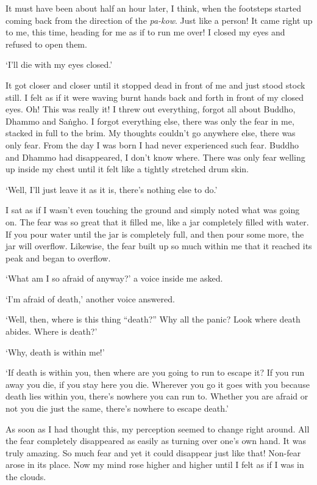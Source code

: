 It must have been about half an hour later, I think, when the footsteps started coming back from the direction of the \textit{pa-kow}. Just like a person! It came right up to me, this time, heading for me as if to run me over! I closed my eyes and refused to open them.

`I'll die with my eyes closed.'

It got closer and closer until it stopped dead in front of me and just stood stock still. I felt as if it were waving burnt hands back and forth in front of my closed eyes. Oh! This was really it! I threw out everything, forgot all about Buddho, Dhammo and Sa\.ngho. I forgot everything else, there was only the fear in me, stacked in full to the brim. My thoughts couldn't go anywhere else, there was only fear. From the day I was born I had never experienced such fear. Buddho and Dhammo had disappeared, I don't know where. There was only fear welling up inside my chest until it felt like a tightly stretched drum skin.

`Well, I'll just leave it as it is, there's nothing else to do.'

I sat as if I wasn't even touching the ground and simply noted what was going on. The fear was so great that it filled me, like a jar completely filled with water. If you pour water until the jar is completely full, and then pour some more, the jar will overflow. Likewise, the fear built up so much within me that it reached its peak and began to overflow.

`What am I so afraid of anyway?' a voice inside me asked.

`I'm afraid of death,' another voice answered.

`Well, then, where is this thing ``death?'' Why all the panic? Look where death abides. Where is death?'

`Why, death is within me!'

`If death is within you, then where are you going to run to escape it? If you run away you die, if you stay here you die. Wherever you go it goes with you because death lies within you, there's nowhere you can run to. Whether you are afraid or not you die just the same, there's nowhere to escape death.'

As soon as I had thought this, my perception seemed to change right around. All the fear completely disappeared as easily as turning over one's own hand. It was truly amazing. So much fear and yet it could disappear just like that! Non-fear arose in its place. Now my mind rose higher and higher until I felt as if I was in the clouds.

